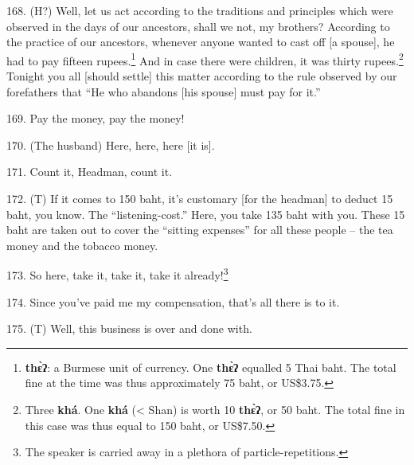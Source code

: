 168. (H?) Well, let us act according to the traditions and principles which were
observed in the days of our ancestors, shall we not, my brothers? According to
the practice of our ancestors, whenever anyone wanted to cast off [a spouse], he
had to pay fifteen rupees.\footnote{\textbf{thɛ̀ʔ}: a Burmese unit of currency. One \textbf{thɛ̀ʔ} equalled 5 Thai baht. The total fine at the time was thus approximately 75 baht, or US\$3.75.} And in case there were children, it was thirty rupees.\footnote{Three \textbf{khá}. One \textbf{khá} (< Shan) is worth 10 \textbf{thɛ̀ʔ}, or 50 baht. The total fine in this case was thus equal to 150 baht, or US\$7.50.}
Tonight you all [should settle] this matter according to the rule observed by our
forefathers that ``He who abandons [his spouse] must pay for it.''

169. Pay the money, pay the money!

170. (The husband) Here, here, here [it is].

171. Count it, Headman, count it.

172. (T) If it comes to 150 baht, it's customary [for the headman] to deduct 15
baht, you know. The ``listening-cost.'' Here, you take 135 baht with you.
These 15 baht are taken out to cover the ``sitting expenses'' for
all these people -- the tea money and the tobacco money.

173. So here, take it, take it, take it already!\footnote{The speaker is carried away in a plethora of particle-repetitions.}

174.  Since you've paid me my compensation, that's
all there is to it.

175. (T) Well, this business is over and done with.

